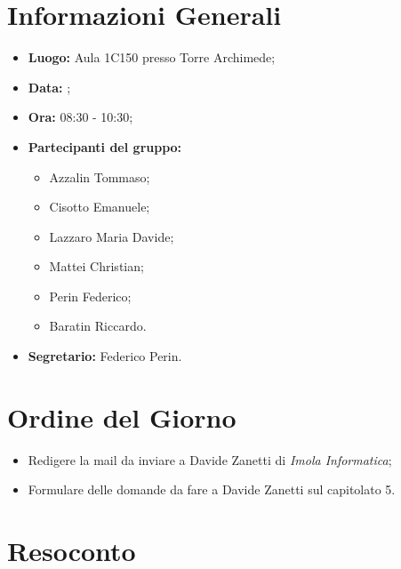 \section{Informazioni Generali}
\begin{itemize}
\item \textbf{Luogo:} Aula 1C150 presso Torre Archimede;
\item \textbf{Data:} \Data;
\item \textbf{Ora:} 08:30 - 10:30;
\item \textbf{Partecipanti del gruppo:}
	\begin{itemize}
	\item Azzalin Tommaso; 
	\item Cisotto Emanuele;
	\item Lazzaro Maria Davide;
	\item Mattei Christian;
	\item Perin Federico;
	\item Baratin Riccardo.
	\end{itemize} 
\item \textbf{Segretario:} Federico Perin.
\end{itemize}

\section{Ordine del Giorno}
\begin{itemize}
\item Redigere la mail da inviare a Davide Zanetti di \textit{Imola Informatica};
\item Formulare delle domande da fare a Davide Zanetti sul capitolato 5.
\end{itemize}

\section{Resoconto}
